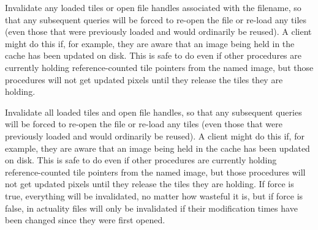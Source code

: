 Invalidate any loaded tiles or open file handles associated with
the filename, so that any subsequent queries will be forced to
re-open the file or re-load any tiles (even those that were
previously loaded and would ordinarily be reused).  A client
might do this if, for example, they are aware that an image
being held in the cache has been updated on disk.  This is safe
to do even if other procedures are currently holding 
reference-counted tile pointers from the named image, but those 
procedures will not get updated pixels until they release the 
tiles they are holding.
\apiend

Invalidate all loaded tiles and open file handles, so that any
subsequent queries will be forced to re-open the file or re-load any
tiles (even those that were previously loaded and would ordinarily be
reused).  A client might do this if, for example, they are aware that an
image being held in the cache has been updated on disk.  This is safe to
do even if other procedures are currently holding reference-counted tile
pointers from the named image, but those procedures will not get updated
pixels until they release the tiles they are holding.  If force is true,
everything will be invalidated, no matter how wasteful it is, but if
force is false, in actuality files will only be invalidated if their
modification times have been changed since they were first opened.
\apiend


\chapwidthend
